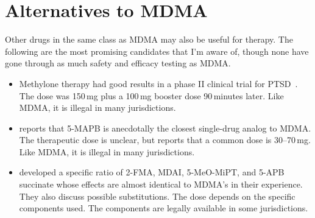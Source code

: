 \documentclass[11pt,oneside]{book}
\let\cite\parencite
\begin{document}
\chapter{Alternatives to MDMA}
Other drugs in the same class as MDMA may also be useful for therapy. The following are the most promising candidates that I'm aware of, though none have gone through as much safety and efficacy testing as MDMA.
\begin{itemize}
    \item Methylone therapy had good results in a phase II clinical trial for PTSD~\cite{methyloneRCT}. The dose was 150\,mg plus a 100\,mg booster dose 90\,minutes later. Like MDMA, it is illegal in many jurisdictions.
    \item \textcite{baggottNewEntactogens} reports that 5-MAPB is anecdotally the closest single-drug analog to MDMA. The therapeutic dose is unclear, but \textcite{erowid5MAPB} reports that a common dose is 30--70\,mg. Like MDMA, it is illegal in many jurisdictions.
    \item \textcite{boraxMDMA} developed a specific ratio of 2-FMA, MDAI, 5-MeO-MiPT, and 5-APB succinate whose effects are almost identical to MDMA's in their experience. They also discuss possible substitutions. The dose depends on the specific components used. The components are legally available in some jurisdictions.
\end{itemize}

\end{document}
